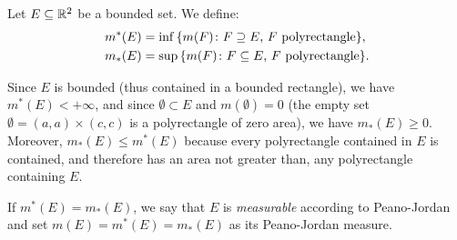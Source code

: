 \begin{definition}
\label{def:peano-jordan}%
%
%
%
%
%
Let $E\subseteq {\mathbb R}^2$ be a bounded set. We define:
\begin{align*}
m^*(E) &= \inf{\left\{ m(F)\colon \text{$F\supseteq E$, $F$ polyrectangle} \right\}}, \\
m_*(E) &= \sup{\left\{ m(F)\colon \text{$F\subseteq E$, $F$ polyrectangle} \right\}}.
\end{align*}

Since $E$ is bounded (thus contained in a bounded rectangle), we have
$m^*(E)<+\infty$, and since $\emptyset \subset E$ and $m(\emptyset)=0$ (the
empty set $\emptyset = (a,a) \times (c,c)$ is a polyrectangle of zero area), we
have $m_*(E)\ge 0$. Moreover, $m_*(E)\le m^*(E)$ because every polyrectangle
contained in $E$ is contained, and therefore has an area not greater than, any
polyrectangle containing $E$.

If $m^*(E) = m_*(E)$, we say that $E$ is \emph{measurable}%
%
 according to Peano-Jordan and set $m(E) = m^*(E) = m_*(E)$ as its Peano-Jordan measure.
\end{definition}

